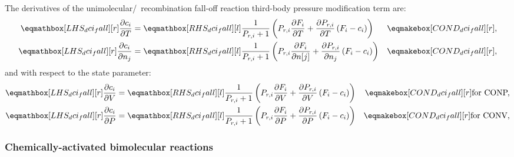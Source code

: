\documentclass[12pt]{article}
\newcommand{\conp}{CONP}
\newcommand{\conv}{CONV}
\newcommand{\dconp}{\ifmmode\text{for \conp,}\else for \conp,\fi}
\newcommand{\dconv}{\ifmmode\text{for \conv,}\else for \conv.\fi}
\begin{document}
The derivatives of the unimolecular\slash~recombination fall-off reaction third-body pressure modification term are:
\begin{align}
 \label{e:dci_fall_dt}
 \lhs{dci_fall}{\frac{\partial c_{i} }{\partial T }} &= \rhs{dci_fall}{\frac{1}{P_{r, i} + 1} \left(P_{r, i} \frac{\partial F_{i} }{\partial T } + \frac{\partial P_{r, i} }{\partial T } \left(F_{i} - c_{i}\right)\right)} & \cond{dci_fall}{,}\\
 \label{e:dci_fall_dnj}
 \lhs{dci_fall}{\frac{\partial c_{i} }{\partial n_j}} &= \rhs{dci_fall}{\frac{1}{P_{r, i} + 1} \left(P_{r, i} \frac{\partial F_{i} }{\partial n[j] } + \frac{\partial P_{r, i} }{\partial n_j } \left(F_{i} - c_{i}\right)\right)} & \cond{dci_fall}{,}
\end{align}
and with respect to the state parameter:
\begin{subequations}
 \label{e:dci_fall_de}
 \begin{align}
  \lhs{dci_fall}{\frac{\partial c_i }{\partial V }} &= \rhs{dci_fall}{\frac{1}{P_{r, i} + 1} \left(P_{r, i} \frac{\partial F_{i} }{\partial V } + \frac{\partial P_{r, i} }{\partial V } \left(F_{i} - c_{i}\right)\right)} & \cond{dci_fall}{\dconp} \\
  \lhs{dci_fall}{\frac{\partial c_i }{\partial P }} &= \rhs{dci_fall}{\frac{1}{P_{r, i} + 1} \left(P_{r, i} \frac{\partial F_{i} }{\partial P } + \frac{\partial P_{r, i} }{\partial P } \left(F_{i} - c_{i}\right)\right)} & \cond{dci_fall}{\dconv}
 \end{align}
\end{subequations}

\subsubsection{Chemically-activated bimolecular reactions}
\label{s:dchem}
\end{document}
